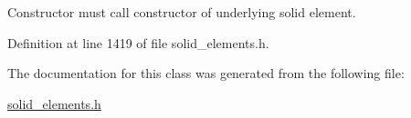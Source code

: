 Constructor must call constructor of underlying solid element. 



Definition at line 1419 of file solid\+\_\+elements.\+h.



The documentation for this class was generated from the following file\+:\begin{DoxyCompactItemize}
\item 
\hyperlink{solid__elements_8h}{solid\+\_\+elements.\+h}\end{DoxyCompactItemize}
